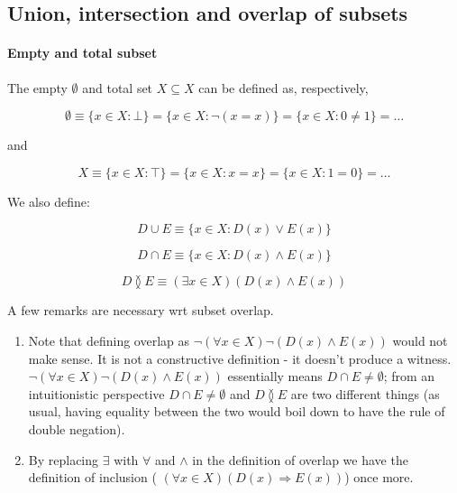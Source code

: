

% 

\subsection{Union, intersection and overlap of subsets}

\paragraph{Empty and total subset} The empty $\emptyset$ and total set
$X \subseteq X$ can be defined as, respectively,

\[ \emptyset \equiv \{ x \in X : \bot \}= \{ x \in X : \neg(x = x) \}
  = \{ x \in X : 0 \neq 1 \} = \ldots \]

and

\[ X \equiv \{ x \in X : \top \} = \{ x \in X: x = x \} = \{ x \in X :
  1= 0 \} = \ldots \]

We also define:

\begin{definition}
  \[ D \cup E \equiv \{ x \in X : D(x) \vee E(x) \} \]
\end{definition}

\begin{definition}
  \[D \cap E \equiv \{ x \in X : D(x) \wedge E(x) \}\]
\end{definition}

\begin{definition}
  \[ D \between E \equiv (\exists x \in X)(D(x) \wedge E(x)) \]
\end{definition}

A few remarks are necessary wrt subset overlap.

\begin{enumerate}
\item Note that defining overlap as \(\neg(\forall x \in X)\neg(D(x)
  \wedge E(x))\) would not make sense.  It is not a constructive
  definition - it doesn't produce a witness.  \(\neg(\forall x \in
  X)\neg(D(x) \wedge E(x))\) essentially means \(D \cap E \neq
  \emptyset\); from an intuitionistic perspective \(D \cap E \neq
  \emptyset\) and \(D \between E\) are two different things (as usual,
  having equality between the two would boil down to have the rule of
  double negation).
\item By replacing \(\exists\) with \(\forall\) and \(\wedge\) in the
  definition of overlap we have the definition of inclusion ( \((\forall
  x \in X) (D(x) \Rightarrow E(x))\)) once more.
\end{enumerate}


